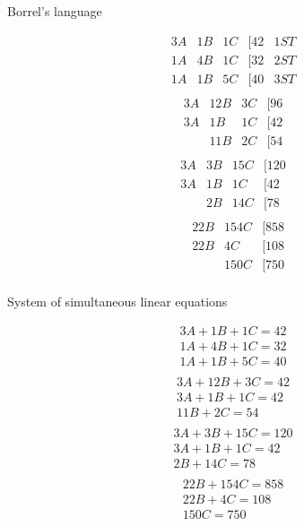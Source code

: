 \documentclass[12pt]{article}
\begin{document}
\begin{minipage}{0.45\textwidth}
 	\begin{center}
 	  Borrel's language
 	\end{center}
	\[
    	\begin{array}{ccccc}
		3A & 1B & 1C & [42 & 1ST\\
		1A & 4B & 1C & [32 & 2ST\\
		1A & 1B & 5C & [40 & 3ST\\
		\end{array}
    \]
    \[
    	\begin{array}{cccc}
		3A & 12B & 3C & [96 \\
		3A & 1B & 1C & [42 \\
		   & 11B & 2C & [54 \\
		\end{array}
    \]
    \[
    	\begin{array}{cccc}
		3A & 3B & 15C & [120 \\
		3A & 1B & 1C & [42 \\
		   & 2B & 14C & [78 \\
		\end{array}
    \]
    \[
    	\begin{array}{cccc}
			& 22B & 154C & [858 \\
		    & 22B & 4C & [108 \\
		   	&	 & 150C & [750 \\
		\end{array}
    \]
\end{minipage}%
\hfill
\begin{minipage}{0.45\textwidth}
	\begin{center}
    System of simultaneous linear equations
  \end{center}
    \[
    	\begin{array}{c}
		3A + 1B + 1C = 42 \\
        1A + 4B + 1C = 32 \\
        1A + 1B + 5C = 40 \\
		\end{array}
    \]
    \[
    	\begin{array}{c}
		3A + 12B + 3C = 42 \\
        3A + 1B + 1C = 42 \\
             11B + 2C = 54 \\
		\end{array}
    \]
    \[
    	\begin{array}{c}
		3A + 3B + 15C = 120 \\
        3A + 1B + 1C = 42 \\
             2B + 14C = 78 \\
		\end{array}
    \]
    \[
    	\begin{array}{c}
		22B + 154C = 858 \\
        22B + 4C = 108\\
             150C = 750 \\
		\end{array}
    \]
\end{minipage}%
\end{document}
